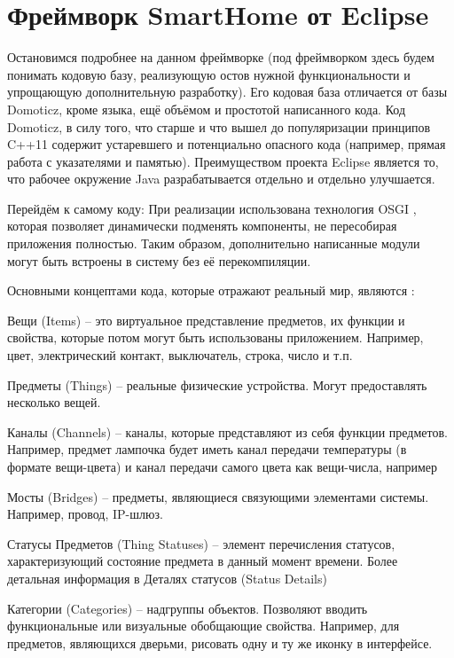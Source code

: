 \section{Фреймворк SmartHome от Eclipse}

Остановимся подробнее на данном фреймворке (под фреймворком здесь будем понимать кодовую базу, реализующую остов нужной функциональности и упрощающую дополнительную разработку).
Его кодовая база отличается от базы Domoticz, кроме языка, ещё объёмом и простотой написанного кода.
Код Domoticz, в силу того, что старше и что вышел до популяризации принципов C++11 содержит устаревшего и потенциально опасного кода (например, прямая работа с указателями и памятью).
Преимуществом проекта Eclipse является то, что рабочее окружение Java разрабатывается отдельно и отдельно улучшается.

Перейдём к самому коду:
При реализации использована технология OSGI \cite{OSGI}, которая позволяет динамически подменять компоненты, не пересобирая приложения полностью.
Таким образом, дополнительно написанные модули могут быть встроены в систему без её перекомпиляции.

Основными концептами кода, которые отражают реальный мир, являются \cite{EclipseDoc}:
\begin{list}{}{}
    \item Вещи (Items) -- это виртуальное представление предметов, их функции и свойства, которые потом могут быть использованы приложением. Например, цвет, электрический контакт, выключатель, строка, число и т.п.
    \item Предметы (Things) -- реальные физические устройства. Могут предоставлять несколько вещей.
    \item Каналы (Channels) -- каналы, которые представляют из себя функции предметов. Например, предмет лампочка будет иметь канал передачи температуры (в формате вещи-цвета) и канал передачи самого цвета как вещи-числа, например
    \item Мосты (Bridges) -- предметы, являющиеся связующими элементами системы. Например, провод, IP-шлюз.
    \item Статусы Предметов (Thing Statuses) -- элемент перечисления статусов, характеризующий состояние предмета в данный момент времени. Более детальная информация в Деталях статусов (Status Details)
    \item Категории (Categories) -- надгруппы объектов. Позволяют вводить функциональные или визуальные обобщающие свойства. Например, для предметов, являющихся дверьми, рисовать одну и ту же иконку в интерфейсе.
\end{list}


